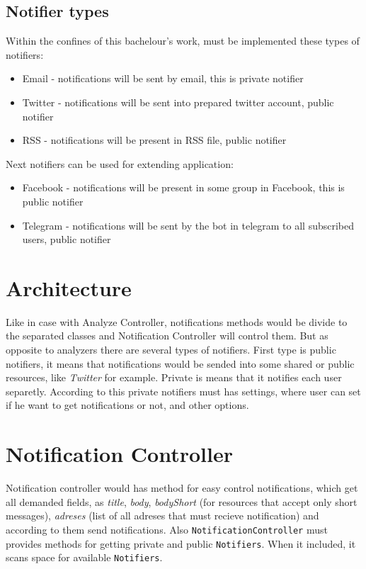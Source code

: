 \subsection{Notifier types}
\label{subsec:notifiers}

Within the confines of this bachelour's work, must be implemented these types of notifiers:
\begin{itemize} 
\item Email - notifications will be sent by email, this is private notifier
\item Twitter - notifications will be sent into prepared twitter account, public notifier
\item RSS - notifications will be present in RSS file, public notifier
\end{itemize}

Next notifiers can be used for extending application:

\begin{itemize} 
\item Facebook - notifications will be present in some group in Facebook, this is public notifier
\item Telegram - notifications will be sent by the bot in telegram to all subscribed users, public notifier
\end{itemize}

\section{Architecture}

Like in case with Analyze Controller, notifications methods would be divide  to the separated classes and Notification Controller will control them. But as opposite to analyzers there are several types of notifiers. First type is public notifiers, it means that notifications would be sended into some shared or public resources, like \emph{Twitter} for example. Private is means that it notifies each user separetly. According to this private notifiers must has settings, where user can set if he want to get notifications or not, and other options.

\section{Notification Controller}

Notification controller would has method for easy control notifications, which get all demanded fields, as \emph{title}, \emph{body}, \emph{bodyShort} (for resources that accept only short messages), \emph{adreses} (list of all adreses that must recieve notification) and according to them send notifications. Also \texttt{NotificationController} must provides methods for getting private and public \texttt{Notifiers}. When it included, it scans space for available \texttt{Notifiers}.


